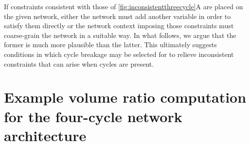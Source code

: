 If constraints consistent with those of \autoref{fig:inconsistentthreecycle}A are placed on the given network, either the network must add another variable in order to satisfy them directly or the network context imposing those constraints must coarse-grain the network in a suitable way. In what follows, we argue that the former is much more plausible than the latter. This ultimately suggests conditions in which cycle breakage may be selected for to relieve inconsistent constraints that can arise when cycles are present.


\section{Example volume ratio computation for the four-cycle network architecture}\label{secsupp:fourcycleexample}

